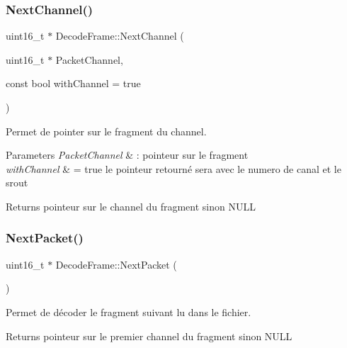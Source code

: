 \subsubsection{\texorpdfstring{Next\+Channel()}{NextChannel()}}
{\footnotesize\ttfamily uint16\+\_\+t $\ast$ Decode\+Frame\+::\+Next\+Channel (\begin{DoxyParamCaption}\item[{uint16\+\_\+t $\ast$}]{Packet\+Channel,  }\item[{const bool}]{with\+Channel = {\ttfamily true} }\end{DoxyParamCaption})}



Permet de pointer sur le fragment du channel. 


\begin{DoxyParams}{Parameters}
{\em Packet\+Channel} & \+: pointeur sur le fragment \\
\hline
{\em with\+Channel} & = true le pointeur retourné sera avec le numero de canal et le srout \\
\hline
\end{DoxyParams}
\begin{DoxyReturn}{Returns}
pointeur sur le channel du fragment sinon N\+U\+LL 
\end{DoxyReturn}
\mbox{\label{classDecodeFrame_a626bb469119a8a2732a57f1a683750c0}} 
\subsubsection{\texorpdfstring{Next\+Packet()}{NextPacket()}}
{\footnotesize\ttfamily uint16\+\_\+t $\ast$ Decode\+Frame\+::\+Next\+Packet (\begin{DoxyParamCaption}{ }\end{DoxyParamCaption})}



Permet de décoder le fragment suivant lu dans le fichier. 

\begin{DoxyReturn}{Returns}
pointeur sur le premier channel du fragment sinon N\+U\+LL 
\end{DoxyReturn}
\mbox{\label{classDecodeFrame_a83d99fa14a97a0a0d7649afe63a44696}} 
